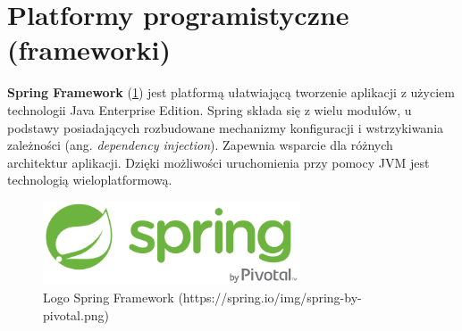 \section{Platformy programistyczne (frameworki)}
\textbf{Spring Framework} (\ref{spring_logo}) jest platformą ułatwiającą tworzenie aplikacji z użyciem technologii Java Enterprise Edition. Spring składa się z wielu modułów, u podstawy posiadających rozbudowane mechanizmy konfiguracji i wstrzykiwania zależności (ang. \textit{dependency injection}). Zapewnia wsparcie dla różnych architektur aplikacji.\cite{spring} Dzięki możliwości uruchomienia przy pomocy JVM jest technologią wieloplatformową.
\begin{figure}[!ht]
	\begin{center}
		\includegraphics[width=3in]{img/logo/spring.png}
		\caption{Logo Spring Framework (https://spring.io/img/spring-by-pivotal.png)}
		\label{spring_logo}
	\end{center}
\end{figure}

